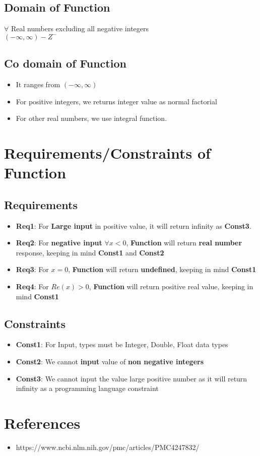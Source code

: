 \documentclass{article}
\begin{document}
\subsection{Domain of Function}
$\forall$ Real numbers excluding all negative integers \\
$(-\infty, \infty) - Z^{-}$

\subsection{Co domain of Function}
\begin{itemize}
\item It ranges from $(-\infty, \infty)$
\item For positive integers, we returns integer value as normal factorial
\item For other real numbers, we use integral function.
\end{itemize}

\section{Requirements/Constraints of Function}
\subsection{Requirements}
\begin{itemize}
\item \textbf{Req1}: For \textbf{Large input} in positive value, it will return infinity as \textbf{Const3}.
\item \textbf{Req2}: For \textbf{negative input} $\forall x<0 $, \textbf{Function} will return \textbf{real number} response, keeping in mind \textbf{Const1} and \textbf{Const2}
\item \textbf{Req3}: For \textbf{$x=0$}, \textbf{Function} will return \textbf{undefined}, keeping in mind \textbf{Const1}
\item \textbf{Req4}: For \textbf{$Re(x) > 0$}, \textbf{Function} will return positive real value, keeping in mind \textbf{Const1}
\end{itemize}

\subsection{Constraints}
\begin{itemize}
\item \textbf{Const1}: For Input, types must be Integer, Double, Float data types
\item \textbf{Const2}: We cannot \textbf{input} value of \textbf{non negative integers}
\item \textbf{Const3}: We cannot input the value large positive number as it will return infinity as a programming language constraint
\end{itemize}

\section{References}
\begin{itemize}
\item https://www.ncbi.nlm.nih.gov/pmc/articles/PMC4247832/
\end{itemize}
\end{document}
